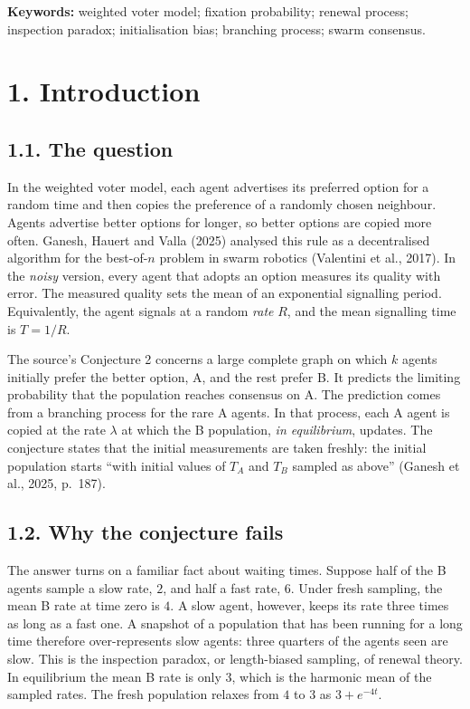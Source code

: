 \documentclass[
  british,
  11pt,
  a4paper,
]{article}
\begin{document}
\textbf{Keywords:} weighted voter model; fixation probability; renewal
process; inspection paradox; initialisation bias; branching process;
swarm consensus.

\section{1. Introduction}\label{introduction}

\subsection{1.1. The question}\label{the-question}

In the weighted voter model, each agent advertises its preferred option
for a random time and then copies the preference of a randomly chosen
neighbour. Agents advertise better options for longer, so better options
are copied more often. Ganesh, Hauert and Valla (2025) analysed this
rule as a decentralised algorithm for the best-of-\(n\) problem in swarm
robotics (Valentini et al., 2017). In the \emph{noisy} version, every
agent that adopts an option measures its quality with error. The
measured quality sets the mean of an exponential signalling period.
Equivalently, the agent signals at a random \emph{rate} \(R\), and the
mean signalling time is \(T=1/R\).

The source's Conjecture 2 concerns a large complete graph on which \(k\)
agents initially prefer the better option, A, and the rest prefer B. It
predicts the limiting probability that the population reaches consensus
on A. The prediction comes from a branching process for the rare A
agents. In that process, each A agent is copied at the rate \(\lambda\)
at which the B population, \emph{in equilibrium}, updates. The
conjecture states that the initial measurements are taken freshly: the
initial population starts ``with initial values of \(T_A\) and \(T_B\)
sampled as above'' (Ganesh et al., 2025, p.~187).

\subsection{1.2. Why the conjecture
fails}\label{why-the-conjecture-fails}

The answer turns on a familiar fact about waiting times. Suppose half of
the B agents sample a slow rate, \(2\), and half a fast rate, \(6\).
Under fresh sampling, the mean B rate at time zero is \(4\). A slow
agent, however, keeps its rate three times as long as a fast one. A
snapshot of a population that has been running for a long time therefore
over-represents slow agents: three quarters of the agents seen are slow.
This is the inspection paradox, or length-biased sampling, of renewal
theory. In equilibrium the mean B rate is only \(3\), which is the
harmonic mean of the sampled rates. The fresh population relaxes from
\(4\) to \(3\) as \(3+e^{-4t}\).
\end{document}
